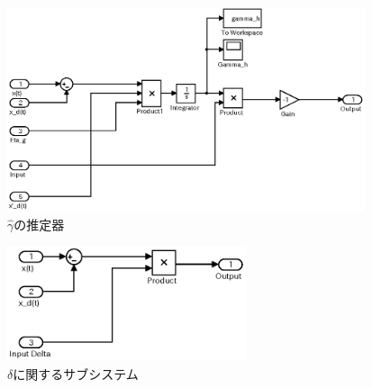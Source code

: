 \documentclass[a4paper,12pt]{jarticle}
\begin{document}
%
%
\begin{figure}[htb]
    \begin{center}
       \includegraphics[width=105mm]{fig/gamma.eps}
        \caption{$\hat{\gamma}$の推定器}
        \label{fig:gamma}
    \end{center}
 \end{figure}
%
%
\begin{figure}[htb]
    \begin{center}
       \includegraphics[width=70mm]{fig/delta.eps}
        \caption{$\delta$に関するサブシステム}
        \label{fig:delta}
    \end{center}
 \end{figure}
\end{document}
